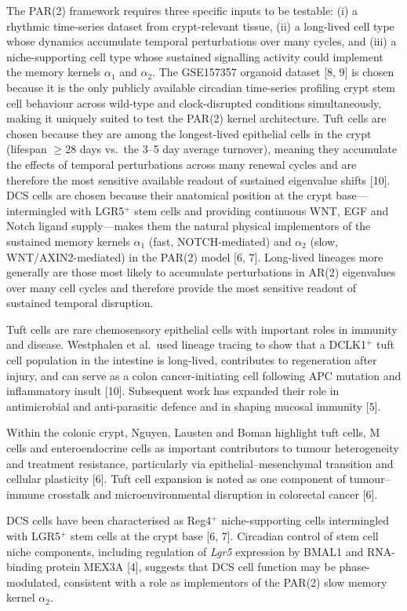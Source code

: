 \documentclass[]{interact}
\begin{document}
The PAR(2) framework requires three specific inputs to be testable: (i) a
rhythmic time-series dataset from crypt-relevant tissue, (ii) a long-lived
cell type whose dynamics accumulate temporal perturbations over many cycles,
and (iii) a niche-supporting cell type whose sustained signalling activity
could implement the memory kernels $\alpha_1$ and $\alpha_2$.
The GSE157357 organoid dataset [8, 9] is chosen because it is the only
publicly available circadian time-series profiling crypt stem cell behaviour
across wild-type and clock-disrupted conditions simultaneously, making it
uniquely suited to test the PAR(2) kernel architecture.
Tuft cells are chosen because they are among the longest-lived epithelial
cells in the crypt (lifespan $\geq 28$ days vs.\ the 3--5 day average
turnover), meaning they accumulate the effects of temporal perturbations
across many renewal cycles and are therefore the most sensitive available
readout of sustained eigenvalue shifts [10].
DCS cells are chosen because their anatomical position at the crypt
base---intermingled with LGR5$^{+}$ stem cells and providing continuous WNT,
EGF and Notch ligand supply---makes them the natural physical implementors of
the sustained memory kernels $\alpha_1$ (fast, NOTCH-mediated) and $\alpha_2$
(slow, WNT/AXIN2-mediated) in the PAR(2) model [6, 7].
Long-lived lineages more generally are those most likely to accumulate
perturbations in AR(2) eigenvalues over many cell cycles and therefore provide
the most sensitive readout of sustained temporal disruption.

Tuft cells are rare chemosensory epithelial cells with important roles in
immunity and disease.
Westphalen et al.\ used lineage tracing to show that a DCLK1$^{+}$ tuft cell
population in the intestine is long-lived, contributes to regeneration after
injury, and can serve as a colon cancer-initiating cell following APC mutation
and inflammatory insult [10].
Subsequent work has expanded their role in antimicrobial and anti-parasitic
defence and in shaping mucosal immunity [5].

Within the colonic crypt, Nguyen, Lausten and Boman highlight tuft cells,
M cells and enteroendocrine cells as important contributors to tumour
heterogeneity and treatment resistance, particularly via
epithelial--mesenchymal transition and cellular plasticity [6].
Tuft cell expansion is noted as one component of tumour--immune crosstalk and
microenvironmental disruption in colorectal cancer [6].

DCS cells have been characterised as Reg4$^{+}$ niche-supporting cells
intermingled with LGR5$^{+}$ stem cells at the crypt base [6, 7].
Circadian control of stem cell niche components, including regulation of
\textit{Lgr5} expression by BMAL1 and RNA-binding protein MEX3A [4], suggests
that DCS cell function may be phase-modulated, consistent with a role as
implementors of the PAR(2) slow memory kernel $\alpha_2$.
\end{document}
